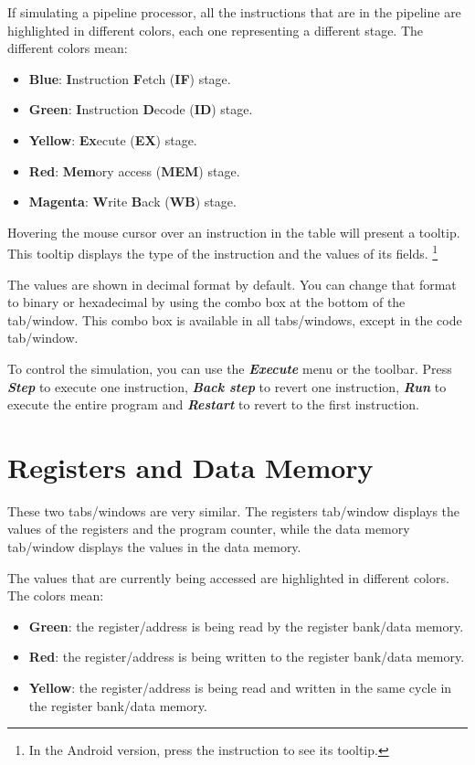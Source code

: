 \documentclass[11pt,a4paper,twoside,titlepage]{report}
\newcommand{\menupath}[1]{\textbf{\emph{#1}}}
\begin{document}
If simulating a pipeline processor, all the instructions that are in the
pipeline are highlighted in different colors, each one representing a
different stage.
The different colors mean:
\begin{itemize}
	\item \textbf{Blue}: \textbf{I}nstruction \textbf{F}etch (\textbf{IF}) stage.
	\item \textbf{Green}: \textbf{I}nstruction \textbf{D}ecode (\textbf{ID}) stage.
	\item \textbf{Yellow}: \textbf{Ex}ecute (\textbf{EX}) stage.
	\item \textbf{Red}: \textbf{Mem}ory access (\textbf{MEM}) stage.
	\item \textbf{Magenta}: \textbf{W}rite \textbf{B}ack (\textbf{WB}) stage.
\end{itemize}

Hovering the mouse cursor over an instruction in the table will present a
tooltip. This tooltip displays the type of the instruction and the values
of its fields. \footnote{In the Android version, press the instruction to
see its tooltip.}

The values are shown in decimal format by default.
You can change that format to binary or hexadecimal by using the combo box
at the bottom of the tab/window.
This combo box is available in all tabs/windows, except in the code tab/window.

To control the simulation, you can use the \menupath{Execute} menu or the toolbar.
Press \menupath{Step} to execute one instruction, \menupath{Back step}
to revert one instruction, \menupath{Run} to execute the entire program and
\menupath{Restart} to revert to the first instruction.


\section{Registers and Data Memory}

These two tabs/windows are very similar.
The registers tab/window displays the values of the registers and the program
counter, while the data memory tab/window displays the values in the data
memory.

The values that are currently being accessed are highlighted in different 
colors. The colors mean:
\begin{itemize}
	\item \textbf{Green}: the register/address is being read by the register
		bank/data memory.
	\item \textbf{Red}: the register/address is being written to the register
		bank/data memory.
	\item \textbf{Yellow}: the register/address is being read and written in
		the same cycle in the register bank/data memory.
\end{itemize}
\end{document}
